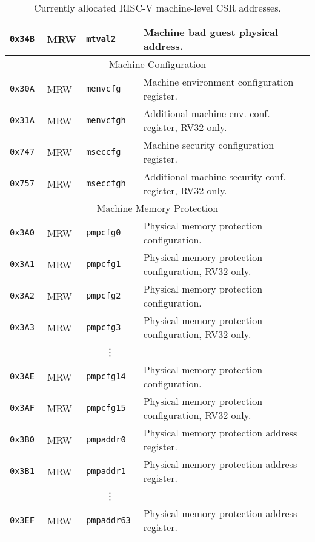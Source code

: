 \begin{table}[htb!]
\begin{center}
\begin{tabular}{|l|l|l|l|}
\tt 0x34B & MRW  &\tt mtval2     & Machine bad guest physical address. \\
\hline
\multicolumn{4}{|c|}{Machine Configuration} \\
\hline
\tt 0x30A & MRW  &\tt menvcfg    & Machine environment configuration register. \\
\tt 0x31A & MRW  &\tt menvcfgh   & Additional machine env. conf. register, RV32 only. \\
\tt 0x747 & MRW  &\tt mseccfg    & Machine security configuration register. \\
\tt 0x757 & MRW  &\tt mseccfgh   & Additional machine security conf. register, RV32 only. \\
\hline
\multicolumn{4}{|c|}{Machine Memory Protection} \\
\hline
\tt 0x3A0 & MRW  &\tt pmpcfg0    & Physical memory protection configuration. \\
\tt 0x3A1 & MRW  &\tt pmpcfg1    & Physical memory protection configuration, RV32 only. \\
\tt 0x3A2 & MRW  &\tt pmpcfg2    & Physical memory protection configuration. \\
\tt 0x3A3 & MRW  &\tt pmpcfg3    & Physical memory protection configuration, RV32 only. \\
& & \multicolumn{1}{c|}{\vdots} & \ \\
\tt 0x3AE & MRW  &\tt pmpcfg14   & Physical memory protection configuration. \\
\tt 0x3AF & MRW  &\tt pmpcfg15   & Physical memory protection configuration, RV32 only. \\
\tt 0x3B0 & MRW  &\tt pmpaddr0   & Physical memory protection address register. \\
\tt 0x3B1 & MRW  &\tt pmpaddr1   & Physical memory protection address register. \\
& & \multicolumn{1}{c|}{\vdots} & \ \\
\tt 0x3EF & MRW  &\tt pmpaddr63  & Physical memory protection address register. \\
\hline
\end{tabular}
\end{center}
\caption{Currently allocated RISC-V machine-level CSR addresses.}
\label{mcsrnames0}
\end{table}

